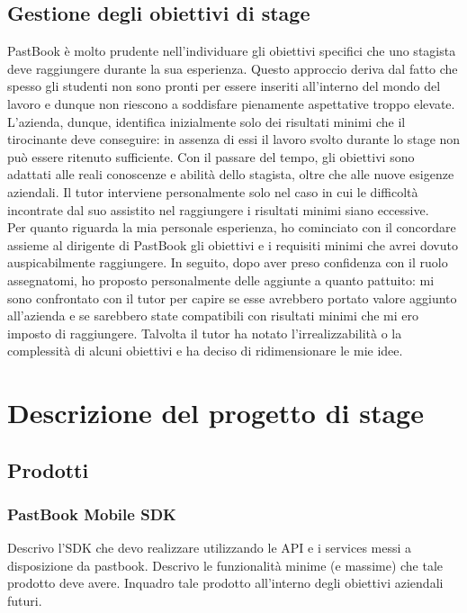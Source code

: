 		\subsection{Gestione degli obiettivi di stage}
			PastBook è molto prudente nell'individuare gli obiettivi specifici che uno stagista deve raggiungere durante la sua
			esperienza. Questo approccio deriva dal fatto che spesso gli studenti non sono pronti per essere inseriti all'interno del
			mondo del lavoro e dunque non riescono a soddisfare pienamente aspettative troppo elevate.\\
			L'azienda, dunque, identifica inizialmente solo dei risultati minimi che il tirocinante deve conseguire: in assenza di essi
			il lavoro svolto durante lo stage non può essere ritenuto sufficiente. Con il passare del tempo, gli obiettivi sono adattati
			alle reali conoscenze e abilità dello stagista, oltre che alle nuove esigenze aziendali. Il tutor interviene personalmente
			solo nel caso in cui le difficoltà incontrate dal suo assistito nel raggiungere i risultati minimi siano eccessive.\\
			Per quanto riguarda la mia personale esperienza, ho cominciato con il concordare assieme al dirigente di PastBook gli
			obiettivi e i requisiti minimi che avrei dovuto auspicabilmente raggiungere. In seguito, dopo aver preso confidenza con il
			ruolo assegnatomi, ho proposto personalmente delle aggiunte a quanto pattuito: mi sono confrontato con il tutor per capire
			se esse avrebbero portato valore aggiunto all'azienda e se sarebbero state compatibili con risultati minimi che mi ero
			imposto di raggiungere. Talvolta il tutor ha notato l'irrealizzabilità o la complessità di alcuni obiettivi e ha deciso di
			ridimensionare le mie idee.
	\section{Descrizione del progetto di stage}
		\subsection{Prodotti}
			\subsubsection{PastBook Mobile SDK}
				Descrivo l'SDK che devo realizzare utilizzando le API e i services messi a disposizione da pastbook. Descrivo le
				funzionalità minime (e massime) che tale prodotto deve avere. Inquadro tale prodotto all'interno degli obiettivi
				aziendali futuri.
